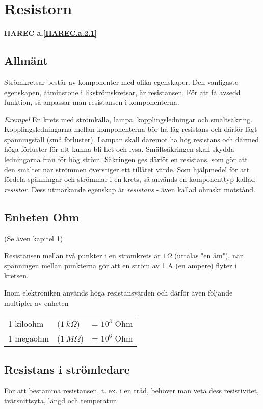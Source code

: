 \section{Resistorn}
\textbf{HAREC a.\ref{HAREC.a.2.1}\label{myHAREC.a.2.1}}

\subsection{Allmänt}

Strömkretsar består av komponenter med olika egenskaper.
Den vanligaste egenskapen, åtminstone i likströmskretsar, är resistansen.
För att få avsedd funktion, så anpassar man resistansen i komponenterna.

\emph{Exempel}
En krets med strömkälla, lampa, kopplingsledningar och smältsäkring.
Kopplingsledningarna mellan komponenterna bör ha
låg resistans och därför lågt spänningsfall
(små förluster). Lampan skall däremot ha
hög resistans och därmed höga förluster för
att kunna bli het och lysa. Smältsäkringen
skall skydda ledningarna från för hög ström.
Säkringen ges därför en resistans, som gör
att den smälter när strömmen överstiger ett
tillåtet värde.
Som hjälpmedel för att fördela spänningar
och strömmar i en krets, så används en
komponenttyp kallad \emph{resistor}. Dess utmärkande egenskap är \emph{resistans} - även kallad
ohmskt motstånd.

\subsection{Enheten Ohm}

(Se även kapitel 1)

Resistansen mellan två punkter i en strömkrets är \(1 \Omega\) (uttalas "en åm"),
när spänningen mellan punkterna gör att en ström av 1 A (en ampere) flyter i kretsen.

Inom elektroniken används höga resistansvärden och därför även följande multipler av enheten
\begin{tabular}{lll}
  1 kiloohm & (\(1\ k\Omega\)) & = \(10^3\) Ohm \\
  1 megaohm & (\(1\ M\Omega\)) & = \(10^6\) Ohm \\
\end{tabular}

\subsection{Resistans i strömledare}

För att bestämma resistansen, t. ex. i en tråd,
behöver man veta dess resistivitet, tvärsnittsyta, längd och temperatur.

